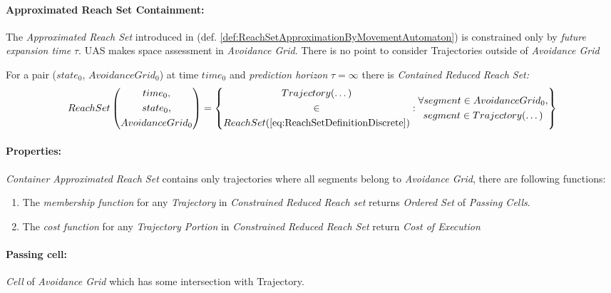     \paragraph{Approximated Reach Set Containment:} The \emph{Approximated Reach Set} introduced in (def. \ref{def:ReachSetApproximationByMovementAutomaton}) is constrained only by \emph{future expansion time} $\tau$. UAS makes space assessment in \emph{Avoidance Grid}. There is no point to consider Trajectories outside of \emph{Avoidance Grid}
    
    \begin{definition}\label{def:ContainedReducedReachSet}
        For a pair ($state_0$, $AvoidanceGrid_0$) at time $time_0$ and \emph{prediction horizon} $\tau=\infty$ there is \emph{Contained Reduced Reach Set:}
        \begin{equation}\label{eq:containedReachSet}
            ReachSet\left(\begin{gathered}time_0,\\state_0,\\AvoidanceGrid_0\end{gathered}\right) = 
            \left\{
                \begin{gathered}
                Trajectory(\dots) \\\in\\ ReachSet(\ref{eq:ReachSetDefinitionDiscrete})
                \end{gathered}
                :
                \begin{gathered}
                \forall segment \in AvoidanceGrid_0,\\ segment \in Trajectory(\dots)    
                \end{gathered}
            \right\}
        \end{equation}
        
		\newpage
        \paragraph{Properties:} \emph{Container Approximated Reach Set} contains only trajectories where all segments belong to \emph{Avoidance Grid}, there are following functions:
        \begin{enumerate}
            \item The \emph{membership function} for any \emph{Trajectory} in \emph{Constrained Reduced Reach set} returns \emph{Ordered Set} of \emph{Passing Cells}. 
            
            \item The \emph{cost function} for any \emph{Trajectory Portion} in \emph{Constrained Reduced Reach Set} return \emph{Cost of Execution}
        \end{enumerate}
        
        \paragraph{Passing cell:} \emph{Cell} of \emph{Avoidance Grid} which has some intersection with {Trajectory}.
    \end{definition}
    
